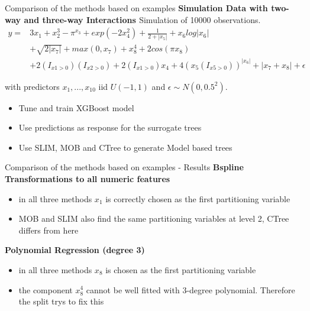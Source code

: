 \documentclass[9pt, xcolor=table]{beamer}
\begin{document}
\begin{frame}{Comparison of the methods based on examples}
\textbf{Simulation Data with two-way and three-way Interactions \citep{Hu.2020}}
Simulation of 10000 observations.
\begin{align*}
y = & 3x_{1} + x_{2}^3 - \pi^{x_{3}} + exp(-2x_{4}^2) + \frac{1}{2+|x_{5}|} + x_{6}log|x_{6}| \\
& + \sqrt{2|x_{7}|} + max(0,x_{7}) + x_{8}^4 + 2cos(\pi x_{8}) \\
& + 2(I_{x1>0})(I_{x2>0}) + 2(I_{x1>0})x_{4} + 4(x_{5}(I_{x5>0}))^{|x_{6}|} + |x_7 + x_8| + \epsilon
\end{align*}

with predictors $x_{1},...,x_{10}$ iid $U(-1,1)$ and $\epsilon \sim N(0,0.5^2)$.

\begin{itemize}
    \item Tune and train XGBoost model
    \item Use predictions as response for the surrogate trees
    \item Use SLIM, MOB and CTree to generate Model based trees 
\end{itemize}

\end{frame}



\begin{frame}{Comparison of the methods based on examples - Results}
\textbf{Bspline Transformations to all numeric features}
\begin{itemize}
    \item in all three methods $x_{1}$ is correctly chosen as the first partitioning variable 
    \item MOB and SLIM also find the same partitioning variables at level 2, CTree differs from here
\end{itemize}

\textbf{Polynomial Regression (degree 3)}
\begin{itemize}
    \item in all three methods $x_{8}$ is chosen as the first partitioning variable 
    \item the component $x_{8}^4$ cannot be well fitted with 3-degree polynomial. Therefore the split trys to fix this

\end{itemize}
    
\end{frame}
\end{document}
